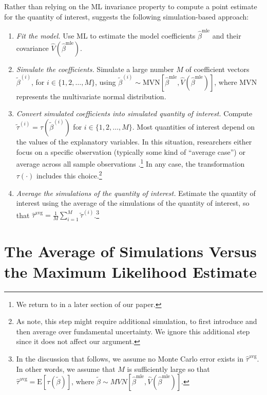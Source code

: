 \documentclass[11pt]{article}
\begin{document}
Rather than relying on the ML invariance property to compute a point estimate for the quantity of interest, \cite{KingTomzWittenberg2000} suggests the following simulation-based approach:\vspace{.1in}
\begin{enumerate}
\item \textit{Fit the model.}
Use ML to estimate the model coefficients $\hat{\beta}^{\text{mle}}$ and their covariance $\hat{V} \left( \hat{\beta}^{\text{mle}} \right)$.
\item \textit{Simulate the coefficients.}
Simulate a large number $M$ of coefficient vectors $\tilde{\beta}^{(i)}$, for $i \in \{1, 2,\ldots, M\}$, using $\tilde{\beta}^{(i)} \sim \text{MVN} \left[ \hat{\beta}^{\text{mle}}, \hat{V} \left( \hat{\beta}^{\text{mle}} \right) \right]$, where MVN represents the multivariate normal distribution.
\item \textit{Convert simulated coefficients into simulated quantity of interest.}
Compute $\tilde{\tau}^{(i)} = \tau \left( \tilde{\beta}^{(i)} \right)$ for $i \in \{1, 2,\ldots, M\}$.
Most quantities of interest depend on the values of the explanatory variables.
In this situation, researchers either focus on a specific observation (typically some kind of ``average case'') or average across all sample observations \citep{HanmerKalkan2013}.\footnote{We return to \cite{HanmerKalkan2013} in a later section of our paper.}
In any case, the transformation $\tau(\cdot)$ includes this choice.\footnote{As \cite{KingTomzWittenberg2000} note, this step might require additional simulation, to first introduce and then average over fundamental uncertainty.
We ignore this additional step since it does not affect our argument.}
\item \textit{Average the simulations of the quantity of interest.}
Estimate the quantity of interest using the average of the simulations of the quantity of interest, so that $\hat{\tau}^{\text{avg}} = \frac{1}{M} \sum_{i = 1}^{M} \tilde{\tau}^{(i)}$.\footnote{In the discussion that follows, we assume no Monte Carlo error exists in $\hat{\tau}^{\text{avg}}$.
In other words, we assume that $M$ is sufficiently large so that $\hat{\tau}^{\text{avg}} = \text{E}\left[ \tau \left(\tilde{\beta} \right) \right]$, where $\tilde{\beta} \sim MVN \left[ \hat{\beta}^{\text{mle}}, \hat{V} \left( \hat{\beta}^{\text{mle}} \right) \right]$.}\\
\end{enumerate}


\section*{The Average of Simulations Versus the Maximum Likelihood Estimate}
\end{document}
